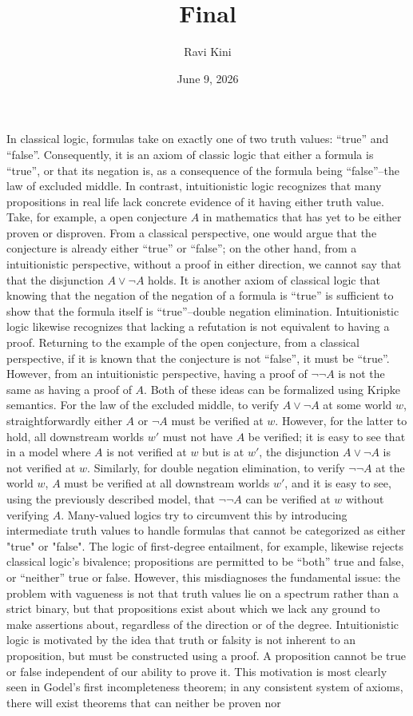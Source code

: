 \documentclass{article}
\title{Final}
\author{Ravi Kini}
\date{June 9, 2026}
\begin{document}
\maketitle

\problem
In classical logic, formulas take on exactly one of two truth values: ``true'' and ``false''. Consequently, it is an axiom of classic logic that either a formula is ``true'', or that its negation is, as a consequence of the formula being ``false''--the law of excluded middle. In contrast, intuitionistic logic recognizes that many propositions in real life lack concrete evidence of it having either truth value. Take, for example, a open conjecture $A$ in mathematics that has yet to be either proven or disproven. From a classical perspective, one would argue that the conjecture is already either ``true'' or ``false''; on the other hand, from a intuitionistic perspective, without a proof in either direction, we cannot say that that the disjunction $A \lor \lnot A$ holds. It is another axiom of classical logic that knowing that the negation of the negation of a formula is ``true'' is sufficient to show that the formula itself is ``true''--double negation elimination. Intuitionistic logic likewise recognizes that lacking a refutation is not equivalent to having a proof. Returning to the example of the open conjecture, from a classical perspective, if it is known that the conjecture is not ``false'', it must be ``true''. However, from an intuitionistic perspective, having a proof of $\lnot\lnot A$ is not the same as having a proof of $A$. Both of these ideas can be formalized using Kripke semantics. For the law of the excluded middle, to verify $A \lor \lnot A$ at some world $w$, straightforwardly either $A$ or $\lnot A$ must be verified at $w$. However, for the latter to hold, all downstream worlds $w'$ must not have $A$ be verified; it is easy to see that in a model where $A$ is not verified at $w$ but is at $w'$, the disjunction $A \lor \lnot A$ is not verified at $w$. Similarly, for double negation elimination, to verify $\lnot \lnot A$ at the world $w$, $A$ must be verified at all downstream worlds $w'$, and it is easy to see, using the previously described model, that $\lnot \lnot A$ can be verified at $w$ without verifying $A$. Many-valued logics try to circumvent this by introducing intermediate truth values to handle formulas that cannot be categorized as either "true" or "false". The logic of first-degree entailment, for example, likewise rejects classical logic's bivalence; propositions are permitted to be ``both'' true and false, or ``neither'' true or false. However, this misdiagnoses the fundamental issue: the problem with vagueness is not that truth values lie on a spectrum rather than a strict binary, but that propositions exist about which we lack any ground to make assertions about, regardless of the direction or of the degree. Intuitionistic logic is motivated by the idea that truth or falsity is not inherent to an proposition, but must be constructed using a proof. A proposition cannot be true or false independent of our ability to prove it. This motivation is most clearly seen in Godel's first incompleteness theorem; in any consistent system of axioms, there will exist theorems that can neither be proven nor 
\end{document}
